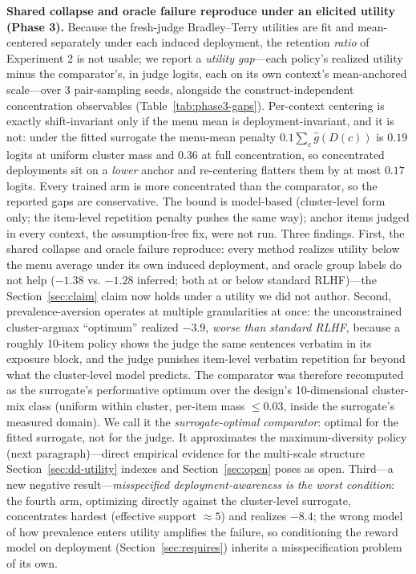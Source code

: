 ﻿\documentclass[11pt]{article}
\begin{document}
\textbf{Shared collapse and oracle failure reproduce under an elicited utility (Phase 3).} Because the fresh-judge Bradley--Terry utilities are fit and mean-centered separately under each induced deployment, the retention \emph{ratio} of Experiment 2 is not usable; we report a \emph{utility gap}---each policy's realized utility minus the comparator's, in judge logits, each on its own context's mean-anchored scale---over 3 pair-sampling seeds, alongside the construct-independent concentration observables (Table~\ref{tab:phase3-gaps}). Per-context centering is exactly shift-invariant only if the menu mean is deployment-invariant, and it is not: under the fitted surrogate the menu-mean penalty \(0.1\sum_c \hat g(D(c))\) is \(0.19\) logits at uniform cluster mass and \(0.36\) at full concentration, so concentrated deployments sit on a \emph{lower} anchor and re-centering flatters them by at most \(0.17\) logits. Every trained arm is more concentrated than the comparator, so the reported gaps are conservative. The bound is model-based (cluster-level form only; the item-level repetition penalty pushes the same way); anchor items judged in every context, the assumption-free fix, were not run. Three findings. First, the shared collapse and oracle failure reproduce: every method realizes utility below the menu average under its own induced deployment, and oracle group labels do not help (\(-1.38\) vs. \(-1.28\) inferred; both at or below standard RLHF)---the Section~\ref{sec:claim} claim now holds under a utility we did not author. Second, prevalence-aversion operates at multiple granularities at once: the unconstrained cluster-argmax ``optimum'' realized \(-3.9\), \emph{worse than standard RLHF}, because a roughly 10-item policy shows the judge the same sentences verbatim in its exposure block, and the judge punishes item-level verbatim repetition far beyond what the cluster-level model predicts. The comparator was therefore recomputed as the surrogate's performative optimum over the design's 10-dimensional cluster-mix class (uniform within cluster, per-item mass \(\leq 0.03\), inside the surrogate's measured domain). We call it the \emph{surrogate-optimal comparator}: optimal for the fitted surrogate, not for the judge. It approximates the maximum-diversity policy (next paragraph)---direct empirical evidence for the multi-scale structure Section~\ref{sec:dd-utility} indexes and Section~\ref{sec:open} poses as open. Third---a new negative result---\emph{misspecified deployment-awareness is the worst condition}: the fourth arm, optimizing directly against the cluster-level surrogate, concentrates hardest (effective support \(\approx 5\)) and realizes \(-8.4\); the wrong model of how prevalence enters utility amplifies the failure, so conditioning the reward model on deployment (Section~\ref{sec:requires}) inherits a misspecification problem of its own.
\end{document}
